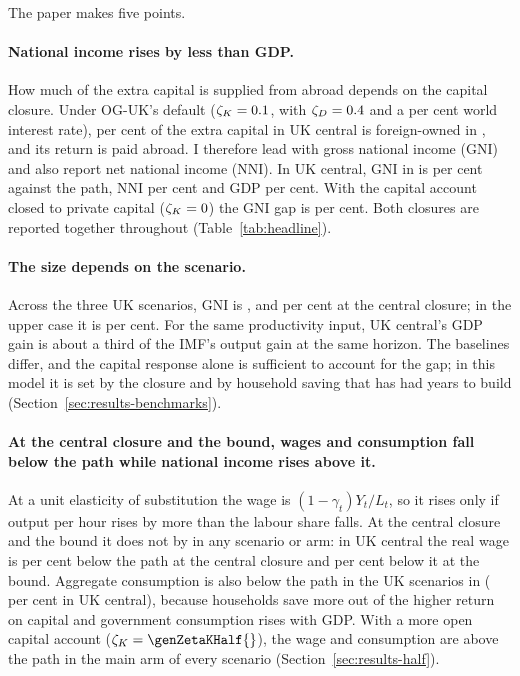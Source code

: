 The paper makes five points.

\paragraph{National income rises by less than GDP.} How much of the extra capital is supplied from abroad depends on the capital closure. Under OG-UK's default ($\zeta_K = 0.1{}$, with $\zeta_D = 0.4{}$ and a \genWorldRatePct{} per cent world interest rate), \genUkCentralForeignShareExtraKCentral{} per cent of the extra capital in UK central is foreign-owned in \genHeadYear{}, and its return is paid abroad. I therefore lead with gross national income (GNI) and also report net national income (NNI). In UK central, GNI in \genHeadYear{} is \genUkCentralMainGniCentral{} per cent against the path, NNI \genUkCentralMainNniCentral{} per cent and GDP \genUkCentralMainGdpCentral{} per cent. With the capital account closed to private capital ($\zeta_K = 0{}$) the GNI gap is \genUkCentralMainGniBoundShort{} per cent. Both closures are reported together throughout (Table~\ref{tab:headline}).

\paragraph{The size depends on the scenario.} Across the three UK scenarios, \genHeadYear{} GNI is \genUkLowMainGniCentralShort{}, \genUkCentralMainGniCentralShort{} and \genUkHighMainGniCentralShort{} per cent at the central closure; in the upper case it is \genKorinekMainGniCentralShort{} per cent. For the same productivity input, UK central's GDP gain is about a third of the IMF's output gain at the same horizon. The baselines differ, and the capital response alone is sufficient to account for the gap; in this model it is set by the closure and by household saving that has had \genYearsShockToHead{} years to build (Section~\ref{sec:results-benchmarks}).

\paragraph{At the central closure and the bound, wages and consumption fall below the path while national income rises above it.} At a unit elasticity of substitution the wage is $(1-\gamma_t)Y_t/L_t$, so it rises only if output per hour rises by more than the labour share falls. At the central closure and the bound it does not by \genHeadYear{} in any scenario or arm: in UK central the real wage is \genUkCentralMainWageCentralAbs{} per cent below the path at the central closure and \genUkCentralMainWageBoundAbs{} per cent below it at the bound. Aggregate consumption is also below the path in the UK scenarios in \genHeadYear{} (\genUkCentralMainConsumptionCentral{} per cent in UK central), because households save more out of the higher return on capital and government consumption rises with GDP. With a more open capital account ($\zetaK = \genZetaKHalf{}$), the wage and consumption are above the path in the main arm of every scenario (Section~\ref{sec:results-half}).

